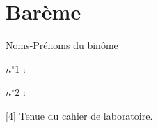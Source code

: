\documentclass[twoside,a4paper,11pt,addpoints,answers]{exam}%
\newcounter{foo} %
\begin{document}
\newpage

\section*{Barème}

\begin{minipage}{0.33\textwidth}
Noms-Prénoms du binôme
\end{minipage}\begin{minipage}{0.33\textwidth}
$n^\circ 1$ :
\end{minipage}\begin{minipage}{0.33\textwidth}
$n^\circ 2$ :
\end{minipage}

\begin{questions}
\setcounter{question}{\thefoo}

[4] Tenue du cahier de laboratoire.


\end{questions}

\begin{center}
\gradetable
\end{center}
\end{document}

